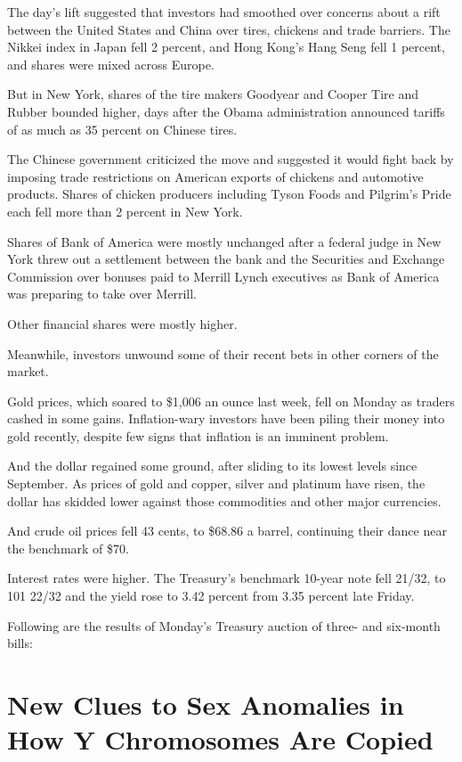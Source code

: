 ﻿\documentclass[12pt]{article}
\begin{document}
The day's lift suggested that investors had smoothed over concerns about a rift between the United
States and China over tires, chickens and trade barriers. The Nikkei index in Japan fell 2 percent,
and Hong Kong's Hang Seng fell 1 percent, and shares were mixed across Europe.

But in New York, shares of the tire makers Goodyear and Cooper Tire and Rubber bounded higher, days
after the Obama administration announced tariffs of as much as 35 percent on Chinese tires.

The Chinese government criticized the move and suggested it would fight back by imposing trade
restrictions on American exports of chickens and automotive products. Shares of chicken producers
including Tyson Foods and Pilgrim's Pride each fell more than 2 percent in New York.

Shares of Bank of America were mostly unchanged after a federal judge in New York threw out a
settlement between the bank and the Securities and Exchange Commission over bonuses paid to Merrill
Lynch executives as Bank of America was preparing to take over Merrill.

Other financial shares were mostly higher.

Meanwhile, investors unwound some of their recent bets in other corners of the market.

Gold prices, which soared to \$1,006 an ounce last week, fell on Monday as traders cashed in some
gains. Inflation-wary investors have been piling their money into gold recently, despite few signs
that inflation is an imminent problem.

And the dollar regained some ground, after sliding to its lowest levels since September. As prices
of gold and copper, silver and platinum have risen, the dollar has skidded lower against those
commodities and other major currencies.

And crude oil prices fell 43 cents, to \$68.86 a barrel, continuing their dance near the benchmark
of \$70.

Interest rates were higher. The Treasury's benchmark 10-year note fell 21/32, to 101 22/32 and the
yield rose to 3.42 percent from 3.35 percent late Friday.

Following are the results of Monday's Treasury auction of three- and six-month bills:

\section{New Clues to Sex Anomalies\cite{anomaly} in How Y Chromosomes\cite{chromosome} Are Copied}
\end{document}
